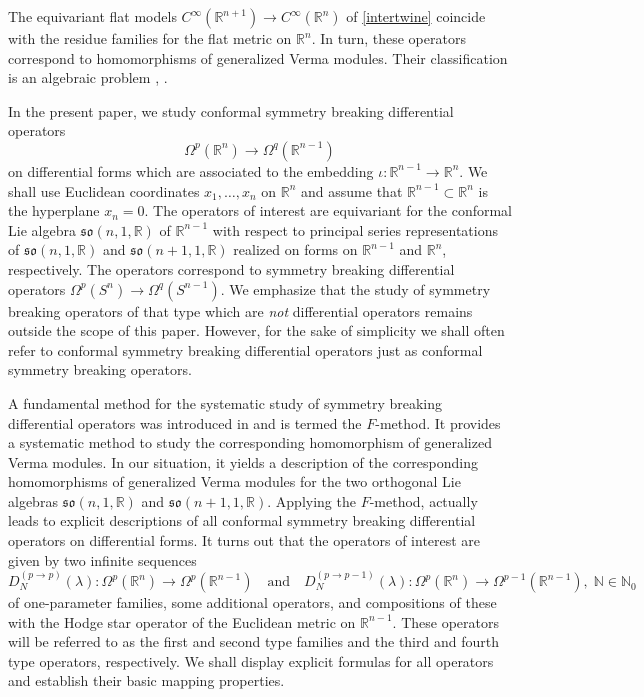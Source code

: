 \documentclass[a4paper,12pt,reqno]{amsart}
\numberwithin{theorem}{subsection}
\numberwithin{equation}{section}
\begin{document}
The equivariant flat models $C^\infty({\mathbb{R}}^{n+1}) \to C^\infty({\mathbb{R}}^n)$ of
\eqref{intertwine} coincide with the residue families for the flat metric on
${\mathbb{R}}^n$. In turn, these operators correspond to homomorphisms of generalized
Verma modules. Their classification is an algebraic problem \cite{Juhl},
\cite{koss}.

In the present paper, we study conformal symmetry breaking differential
operators
$$
   \Omega^p({\mathbb{R}}^n) \to \Omega^q({\mathbb{R}}^{n-1})
$$
on differential forms which are associated to the embedding $\iota: {\mathbb{R}}^{n-1}
\to {\mathbb{R}}^n$. We shall use Euclidean coordinates $x_1,\dots,x_n$ on ${\mathbb{R}}^n$ and
assume that ${\mathbb{R}}^{n-1} \subset {\mathbb{R}}^n$ is the hyperplane $x_n = 0$. The operators
of interest are equivariant for the conformal Lie algebra
$\mathfrak{so}(n,1,{\mathbb{R}})$ of ${\mathbb{R}}^{n-1}$ with respect to principal series
representations of $\mathfrak{so}(n,1,{\mathbb{R}})$ and $\mathfrak{so}(n+1,1,{\mathbb{R}})$
realized on forms on ${\mathbb{R}}^{n-1}$ and ${\mathbb{R}}^n$, respectively. The operators
correspond to symmetry breaking differential operators $\Omega^p (S^n) \to
\Omega^q(S^{n-1})$. We emphasize that the study of symmetry breaking operators
of that type which are {\em not} differential operators remains outside the
scope of this paper. However, for the sake of simplicity we shall often refer
to conformal symmetry breaking differential operators just as conformal
symmetry breaking operators.

A fundamental method for the systematic study of symmetry breaking differential
operators was introduced in \cite{koss,kob,Kobayashi-Pevzner} and is termed the
$F$-method. It provides a systematic method to study the corresponding
homomorphism of generalized Verma modules. In our situation, it yields a
description of the corresponding homomorphisms of generalized Verma modules for
the two orthogonal Lie algebras $\mathfrak{so}(n,1,{\mathbb{R}})$ and
$\mathfrak{so}(n+1,1,{\mathbb{R}})$. Applying the $F$-method, actually leads to explicit
descriptions of all conformal symmetry breaking differential operators on
differential forms. It turns out that the operators of interest are given by
two infinite sequences
$$
   D_N^{(p \to p)}(\lambda): \Omega^p({\mathbb{R}}^n) \to \Omega^p({\mathbb{R}}^{n-1}) \quad
   \mbox{and} \quad D_N^{(p \to p-1)}(\lambda): \Omega^p({\mathbb{R}}^n) \to
   \Omega^{p-1}({\mathbb{R}}^{n-1}), \; {\mathbb{N}} \in {\mathbb{N}}_0
$$
of one-parameter families, some additional operators, and compositions of these
with the Hodge star operator of the Euclidean metric on ${\mathbb{R}}^{n-1}$. These
operators will be referred to as the first and second type families and the
third and fourth type operators, respectively. We shall display explicit
formulas for all operators and establish their basic mapping properties.
\end{document}
